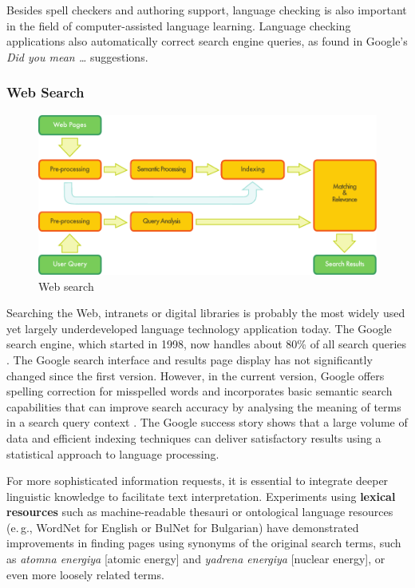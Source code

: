 \documentclass[]{../../metanetpaper}
\begin{document}
\begin{multicols}{2}

Besides spell checkers and authoring support, language checking is also important in the field of computer-assisted language learning. 
Language checking applications also automatically correct search engine queries, as found in Google's \textit{Did you mean \dots} suggestions.

\subsubsection{Web Search}

\begin{figure}[htb]
  \center
  \includegraphics[width=\textwidth]{../_media/english/web_search_architecture}
  \caption{Web search}
  \label{fig:websearcharch_en}
 \end{figure}

Searching the Web, intranets or digital libraries is probably the most widely used yet largely underdeveloped language technology application today. The Google search engine, which started in 1998, now handles about 80\% of all search queries \cite{spi1}. 
The Google search interface and results page display has not significantly changed since the first version. However, in the current version, Google offers spelling correction for misspelled words and incorporates basic semantic search capabilities that can improve search accuracy by analysing the meaning of terms in a search query context \cite{pc1}. The Google success story shows that a large volume of data and efficient indexing techniques can deliver satisfactory results using a statistical approach to language processing. 

For more sophisticated information requests, it is essential to integrate deeper linguistic knowledge to facilitate text interpretation. Experiments using \textbf{lexical resources} such as machine-readable thesauri or ontological language resources (e.\,g., WordNet for English or BulNet for Bulgarian) have demonstrated improvements in finding pages using synonyms of the original search terms, such as {\it atomna energiya} [atomic energy] and {\it yadrena energiya} [nuclear energy], or even more loosely related terms. 


\end{multicols}
\end{document}
